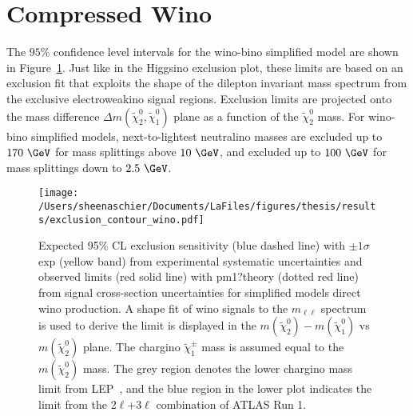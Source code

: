  \section{Compressed Wino}
 The $95\%$ confidence level intervals for the wino-bino simplified model are shown in Figure~\ref{fig:exclusion_contour_wino}.  Just like in the Higgsino exclusion plot, these limits are based on an exclusion fit that exploits the shape of the dilepton invariant mass spectrum from the exclusive electroweakino signal regions.  Exclusion limits are projected onto the mass difference $\Delta m(\tilde{\chi}^0_2, \tilde{\chi}^0_1)$ plane as a function of the $\tilde{\chi}^0_2$ mass.  For wino-bino simplified models, next-to-lightest neutralino masses are excluded up to $170~\GeV$ for mass splittings above $10~\GeV$, and excluded up to $100~\GeV$ for mass splittings down to $2.5~\GeV$. 
   \begin{figure}
 \centering
 \texttt{[image: /Users/sheenaschier/Documents/LaFiles/figures/thesis/results/exclusion\_contour\_wino.pdf]}
  \caption{Expected 95\% CL exclusion sensitivity (blue dashed line) with $\pm1\sigma$ exp (yellow band) from experimental systematic uncertainties and observed limits (red solid line) with pm1?theory (dotted red line) from signal cross-section uncertainties for simplified models direct wino production. 
  A shape fit of wino signals to the $m_{\ell\ell}$ spectrum is used to derive
 the limit is displayed in the $m(\tilde{\chi}^0_2) - m(\tilde{\chi}^0_1)$ vs $m(\tilde{\chi}^0_2)$ plane.
 The chargino $\tilde{\chi}^\pm_1$ mass is assumed equal to the $m(\tilde{\chi}^0_2)$ mass.
  The grey region denotes the lower chargino mass limit from LEP~\cite{LEPlimits}, and the blue region in the lower plot indicates the limit from the 2$\ell$+3$\ell$ combination of ATLAS Run 1.} 
     \label{fig:exclusion_contour_wino}
 \end{figure}
 

